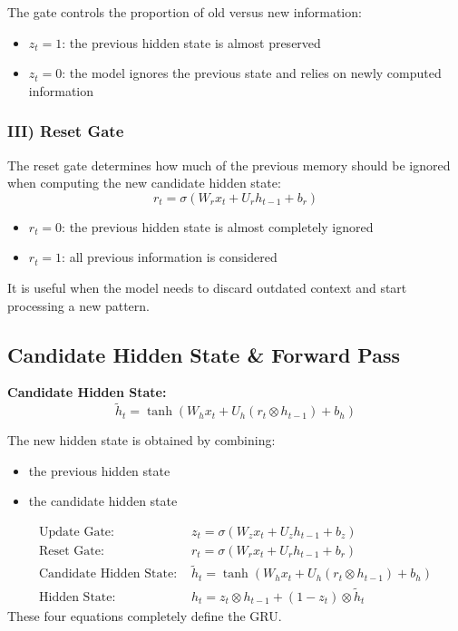 The gate controls the proportion of old versus new information:
\begin{itemize}
    \item $z_t = 1$: the previous hidden state is almost preserved
    \item $z_t = 0$: the model ignores the previous state and relies on newly computed information
\end{itemize}

\subsubsection{III) Reset Gate}

The reset gate determines how much of the previous memory should be ignored when computing the new candidate hidden state:
\begin{equation}
r_t = \sigma(W_r x_t + U_r h_{t-1} + b_r)
\end{equation}
\begin{itemize}
    \item $r_t = 0$: the previous hidden state is almost completely ignored
    \item $r_t = 1$: all previous information is considered
\end{itemize}
It is useful when the model needs to discard outdated context and start processing a new pattern.

\subsection{Candidate Hidden State \& Forward Pass}

\textbf{Candidate Hidden State:}
\begin{equation}
\tilde{h}_t = \tanh(W_h x_t + U_h (r_t \otimes h_{t-1}) + b_h)
\end{equation}

The new hidden state is obtained by combining:
\begin{itemize}
    \item the previous hidden state
    \item the candidate hidden state
\end{itemize}

\begin{propertybox}
\begin{align}
\text{Update Gate: } & z_t = \sigma(W_z x_t + U_z h_{t-1} + b_z) \\
\text{Reset Gate: } & r_t = \sigma(W_r x_t + U_r h_{t-1} + b_r) \\
\text{Candidate Hidden State: } & \tilde{h}_t = \tanh(W_h x_t + U_h (r_t \otimes h_{t-1}) + b_h) \\
\text{Hidden State: } & h_t = z_t \otimes h_{t-1} + (1 - z_t) \otimes \tilde{h}_t
\end{align}
These four equations completely define the GRU.
\end{propertybox}

